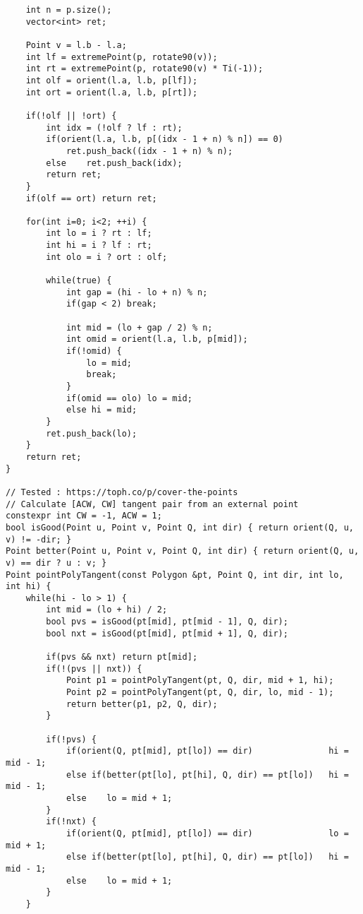 \documentclass[FSZ,a4paper,onesided]{article}
\begin{document}
\begin{multicols*}{\COLS}
\begin{lstlisting}
    int n = p.size();
    vector<int> ret;

    Point v = l.b - l.a;
    int lf = extremePoint(p, rotate90(v));
    int rt = extremePoint(p, rotate90(v) * Ti(-1));
    int olf = orient(l.a, l.b, p[lf]);
    int ort = orient(l.a, l.b, p[rt]);

    if(!olf || !ort) {
        int idx = (!olf ? lf : rt);
        if(orient(l.a, l.b, p[(idx - 1 + n) % n]) == 0)
            ret.push_back((idx - 1 + n) % n);
        else    ret.push_back(idx);
        return ret;
    }
    if(olf == ort) return ret;

    for(int i=0; i<2; ++i) {
        int lo = i ? rt : lf;
        int hi = i ? lf : rt;
        int olo = i ? ort : olf;

        while(true) {
            int gap = (hi - lo + n) % n;
            if(gap < 2) break;

            int mid = (lo + gap / 2) % n;
            int omid = orient(l.a, l.b, p[mid]);
            if(!omid) {
                lo = mid;
                break;
            }
            if(omid == olo) lo = mid;
            else hi = mid;
        }
        ret.push_back(lo);
    }
    return ret;
}

// Tested : https://toph.co/p/cover-the-points
// Calculate [ACW, CW] tangent pair from an external point
constexpr int CW = -1, ACW = 1;
bool isGood(Point u, Point v, Point Q, int dir) { return orient(Q, u, v) != -dir; }
Point better(Point u, Point v, Point Q, int dir) { return orient(Q, u, v) == dir ? u : v; }
Point pointPolyTangent(const Polygon &pt, Point Q, int dir, int lo, int hi) {
    while(hi - lo > 1) {
        int mid = (lo + hi) / 2;
        bool pvs = isGood(pt[mid], pt[mid - 1], Q, dir);
        bool nxt = isGood(pt[mid], pt[mid + 1], Q, dir);

        if(pvs && nxt) return pt[mid];
        if(!(pvs || nxt)) {
            Point p1 = pointPolyTangent(pt, Q, dir, mid + 1, hi);
            Point p2 = pointPolyTangent(pt, Q, dir, lo, mid - 1);
            return better(p1, p2, Q, dir);
        }

        if(!pvs) {
            if(orient(Q, pt[mid], pt[lo]) == dir)               hi = mid - 1;
            else if(better(pt[lo], pt[hi], Q, dir) == pt[lo])   hi = mid - 1;
            else    lo = mid + 1;
        }
        if(!nxt) {
            if(orient(Q, pt[mid], pt[lo]) == dir)               lo = mid + 1;
            else if(better(pt[lo], pt[hi], Q, dir) == pt[lo])   hi = mid - 1;
            else    lo = mid + 1;
        }
    }


\end{lstlisting}
\end{multicols*}
\end{document}
